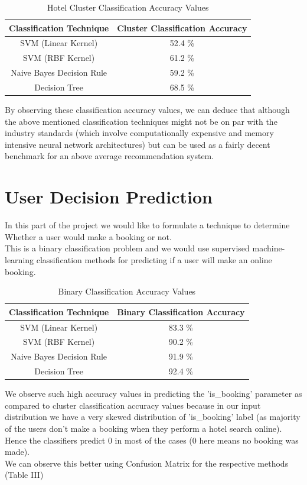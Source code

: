 \documentclass[conference]{IEEEtran}
\begin{document}
\begin{table}[htbp]
\begin{tabular}{|c|c|}
\hline
\textbf{Classification Technique} & \textbf{Cluster Classification Accuracy} \\ \hline
SVM (Linear Kernel)               & 52.4 \%                                  \\ \hline
SVM (RBF Kernel)                  & 61.2 \%                                  \\ \hline
Naive Bayes Decision Rule         & 59.2 \%                                  \\ \hline
Decision Tree                     & 68.5 \%                                    \\ \hline
\end{tabular}
\caption{Hotel Cluster Classification Accuracy Values}
\end{table}
By observing these classification accuracy values, we can deduce that although the above mentioned classification techniques might not be on par with the industry standards (which involve computationally expensive and memory intensive neural network architectures) but can be used as a fairly decent benchmark for an above average recommendation system.
\section{\textbf{User Decision Prediction}}
In this part of the project we would like to formulate a technique to determine Whether a user would make a booking or not.\\
This is a binary classification problem and we would use supervised machine-learning classification methods for predicting if a user will make an online booking.
\begin{table}[htbp]
\begin{tabular}{|c|c|}
\hline
\textbf{Classification Technique} & \textbf{Binary Classification Accuracy} \\ \hline
SVM (Linear Kernel)               & 83.3 \%                          \\ \hline
SVM (RBF Kernel)                  & 90.2 \%                          \\ \hline
Naive Bayes Decision Rule         & 91.9 \%                          \\ \hline
Decision Tree                     & 92.4 \%                          \\ \hline
\end{tabular}
\caption{Binary Classification Accuracy Values}
\end{table}
We observe such high accuracy values in predicting the 'is\_booking' parameter as compared to cluster classification accuracy values because in our input distribution we have a very skewed distribution of 'is\_booking' label (as majority of the users don't make a booking when they perform a hotel search online). Hence the classifiers predict 0 in most of the cases (0 here means no booking was made).\\
We can observe this better using Confusion Matrix for the respective methods (Table III) 
\end{document}
